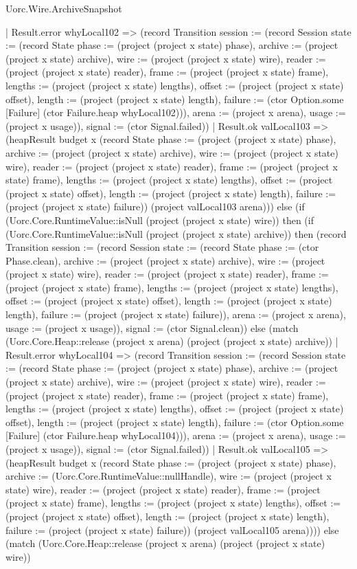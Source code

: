 \begin{lexlean}{Uorc.Wire.ArchiveSnapshot}
\begin{semanticmodule}
{      | Result.error whyLocal102 => (record Transition {session := (record Session {state := (record State {phase := (project (project x state) phase), archive := (project (project x state) archive), wire := (project (project x state) wire), reader := (project (project x state) reader), frame := (project (project x state) frame), lengths := (project (project x state) lengths), offset := (project (project x state) offset), length := (project (project x state) length), failure := (ctor Option.some [Failure] (ctor Failure.heap whyLocal102))}), arena := (project x arena), usage := (project x usage)}), signal := (ctor Signal.failed)})
      | Result.ok valLocal103 => (heapResult budget x (record State {phase := (project (project x state) phase), archive := (project (project x state) archive), wire := (project (project x state) wire), reader := (project (project x state) reader), frame := (project (project x state) frame), lengths := (project (project x state) lengths), offset := (project (project x state) offset), length := (project (project x state) length), failure := (project (project x state) failure)}) (project valLocal103 arena))) else (if (Uorc.Core.RuntimeValue::isNull (project (project x state) wire)) then (if (Uorc.Core.RuntimeValue::isNull (project (project x state) archive)) then (record Transition {session := (record Session {state := (record State {phase := (ctor Phase.clean), archive := (project (project x state) archive), wire := (project (project x state) wire), reader := (project (project x state) reader), frame := (project (project x state) frame), lengths := (project (project x state) lengths), offset := (project (project x state) offset), length := (project (project x state) length), failure := (project (project x state) failure)}), arena := (project x arena), usage := (project x usage)}), signal := (ctor Signal.clean)}) else (match (Uorc.Core.Heap::release (project x arena) (project (project x state) archive))
      | Result.error whyLocal104 => (record Transition {session := (record Session {state := (record State {phase := (project (project x state) phase), archive := (project (project x state) archive), wire := (project (project x state) wire), reader := (project (project x state) reader), frame := (project (project x state) frame), lengths := (project (project x state) lengths), offset := (project (project x state) offset), length := (project (project x state) length), failure := (ctor Option.some [Failure] (ctor Failure.heap whyLocal104))}), arena := (project x arena), usage := (project x usage)}), signal := (ctor Signal.failed)})
      | Result.ok valLocal105 => (heapResult budget x (record State {phase := (project (project x state) phase), archive := (Uorc.Core.RuntimeValue::nullHandle), wire := (project (project x state) wire), reader := (project (project x state) reader), frame := (project (project x state) frame), lengths := (project (project x state) lengths), offset := (project (project x state) offset), length := (project (project x state) length), failure := (project (project x state) failure)}) (project valLocal105 arena)))) else (match (Uorc.Core.Heap::release (project x arena) (project (project x state) wire))
}
\end{semanticmodule}
\end{lexlean}
